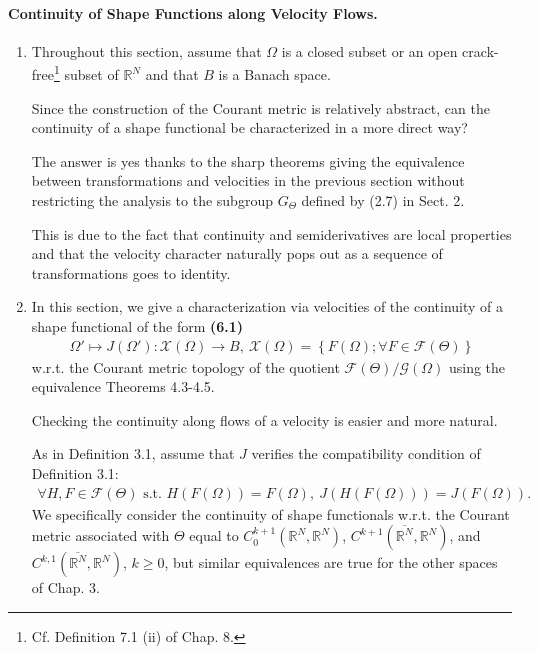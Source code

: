 \documentclass{book}
\numberwithin{equation}{section}
\begin{document}
\paragraph{Continuity of Shape Functions along Velocity Flows.}
\begin{enumerate}
    \item Throughout this section, assume that $\Omega$ is a closed subset or an open crack-free\footnote{Cf. Definition 7.1 (ii) of Chap. 8.} subset of $\mathbb{R}^N$ and that $B$ is a Banach space.
    
    Since the construction of the Courant metric is relatively abstract, can the continuity of a shape functional be characterized in a more direct way?
    
    The answer is yes thanks to the sharp theorems giving the equivalence between transformations and velocities in the previous section without restricting the analysis to the subgroup $G_\Theta$ defined by (2.7) in Sect. 2.
    
    This is due to the fact that continuity and semiderivatives are local properties and that the velocity character naturally pops out as a sequence of transformations goes to identity.
    \item In this section, we give a characterization via velocities of the continuity of a shape functional of the form \textbf{(6.1)}
    \begin{align*}
        \Omega'\mapsto J(\Omega'):\mathcal{X}(\Omega)\to B,\ \mathcal{X}(\Omega) = \left\{F(\Omega);\forall F\in\mathcal{F}(\Theta)\right\}
    \end{align*}
    w.r.t. the Courant metric topology of the quotient $\mathcal{F}(\Theta)/\mathcal{G}(\Omega)$ using the equivalence Theorems 4.3-4.5.
    
    Checking the continuity along flows of a velocity is easier and more natural.
    
    As in Definition 3.1, assume that $J$ verifies the
    compatibility condition of Definition 3.1:
    \begin{align*}
        \forall H,F\in\mathcal{F}(\Theta) \mbox{ s.t. } H\left(F(\Omega)\right) = F(\Omega),\ J(H(F(\Omega))) = J(F(\Omega)).
    \end{align*}
    We specifically consider the continuity of shape functionals w.r.t. the Courant metric associated with $\Theta$ equal to $C_0^{k+1}(\mathbb{R}^N,\mathbb{R}^N)$, $C^{k+1}(\overline{\mathbb{R}^N},\mathbb{R}^N)$, and $C^{k,1}(\overline{\mathbb{R}^N},\mathbb{R}^N)$, $k\ge 0$, but similar equivalences are true for the other spaces of Chap. 3.
    

\end{enumerate}
\end{document}
